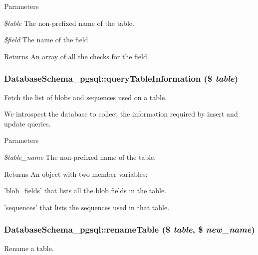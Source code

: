\begin{DoxyParams}{Parameters}
\item[{\em \$table}]The non-\/prefixed name of the table. \item[{\em \$field}]The name of the field. \end{DoxyParams}
\begin{DoxyReturn}{Returns}
An array of all the checks for the field. 
\end{DoxyReturn}
\hypertarget{classDatabaseSchema__pgsql_a5daa813b30b1ae806afb0831782c7d9c}{
\subsubsection[{queryTableInformation}]{\setlength{\rightskip}{0pt plus 5cm}DatabaseSchema\_\-pgsql::queryTableInformation (\$ {\em table})}}
\label{classDatabaseSchema__pgsql_a5daa813b30b1ae806afb0831782c7d9c}
Fetch the list of blobs and sequences used on a table.

We introspect the database to collect the information required by insert and update queries.


\begin{DoxyParams}{Parameters}
\item[{\em \$table\_\-name}]The non-\/prefixed name of the table. \end{DoxyParams}
\begin{DoxyReturn}{Returns}
An object with two member variables:
\begin{DoxyItemize}
\item 'blob\_\-fields' that lists all the blob fields in the table.
\item 'sequences' that lists the sequences used in that table. 
\end{DoxyItemize}
\end{DoxyReturn}
\hypertarget{classDatabaseSchema__pgsql_a899f676d802888ded3f6d4a171794f53}{
\subsubsection[{renameTable}]{\setlength{\rightskip}{0pt plus 5cm}DatabaseSchema\_\-pgsql::renameTable (\$ {\em table}, \/  \$ {\em new\_\-name})}}
\label{classDatabaseSchema__pgsql_a899f676d802888ded3f6d4a171794f53}
Rename a table.


